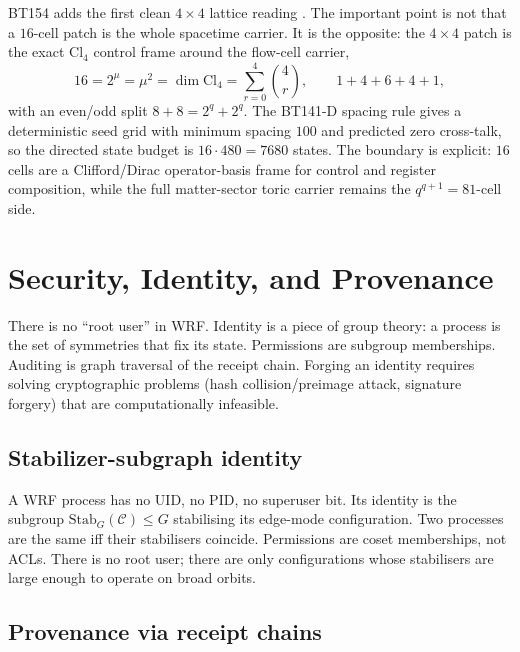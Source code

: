 \documentclass[11pt,letterpaper]{article}
\theoremstyle{remark}
\newcommand{\Stab}{\mathrm{Stab}}
\begin{document}
BT154 adds the first clean $4\times4$ lattice reading \cite{wrf-bt154}. The important
point is not that a $16$-cell patch is the whole spacetime carrier. It is the opposite:
the $4\times4$ patch is the exact $\mathrm{Cl}_4$ control frame around the flow-cell
carrier,
\[
16 = 2^\mu = \mu^2 = \dim \mathrm{Cl}_4
    = \sum_{r=0}^4 {4\choose r},
\qquad
1+4+6+4+1,
\]
with an even/odd split $8+8=2^q+2^q$. The BT141-D spacing rule gives a deterministic
seed grid with minimum spacing $100$ and predicted zero cross-talk, so the directed state
budget is $16\cdot480=7680$ states. The boundary is explicit: $16$ cells are a
Clifford/Dirac operator-basis frame for control and register composition, while the full
matter-sector toric carrier remains the $q^{q+1}=81$-cell side.

\section{Security, Identity, and Provenance}

\begin{plainenglish}
There is no ``root user'' in WRF. Identity is a piece of group theory: a process is
the set of symmetries that fix its state. Permissions are subgroup memberships. Auditing
is graph traversal of the receipt chain. Forging an identity requires solving
cryptographic problems (hash collision/preimage attack, signature forgery) that are computationally
infeasible.
\end{plainenglish}

\subsection{Stabilizer-subgraph identity}

A WRF process has no UID, no PID, no superuser bit. Its identity is the subgroup
$\Stab_G(\mathcal{C}) \le G$ stabilising its edge-mode configuration. Two processes are
the same iff their stabilisers coincide. Permissions are coset memberships, not ACLs.
There is no root user; there are only configurations whose stabilisers are large enough to
operate on broad orbits.

\subsection{Provenance via receipt chains}
\end{document}
